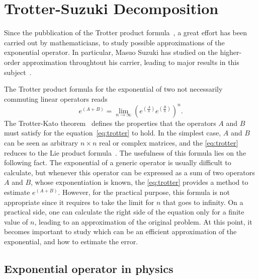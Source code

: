 \chapter{Trotter-Suzuki Decomposition}

Since the pubblication of the Trotter product formula~\cite{Trotter1959}, a great effort has been carried out by mathematicians, to study possible approximations of the exponential operator. In particular, Masuo Suzuki has studied on the higher-order approximation throughtout his carrier, leading to major results in this subject~\cite{Suzuki1985, Suzuki2000}.

The Trotter product formula for the exponential of two not necessarily commuting linear operators reads
\begin{equation} \label{eq:trotter}
e^{(A+B)} = \lim_{n\rightarrow\infty} (e^{(\frac{A}{n})} e^{(\frac{B}{n})})^n.
\end{equation}
The Trotter-Kato theorem~\cite{TrotterKatoTheorem} defines the properties that the operators $A$ and $B$ must satisfy for the equation~\eqref{eq:trotter} to hold. In the simplest case, $A$ and $B$ can be seen as arbitrary $n\times n$ real or complex matrices, and the \eqref{eq:trotter} reduces to the Lie product formula~\cite{LieSophus}. The usefulness of this formula lies on the following fact. The exponential of a generic operator is usually difficult to calculate, but whenever this operator can be expressed as a sum of two operators $A$ and $B$, whose exponentiation is known, the \eqref{eq:trotter} provides a method to estimate $e^{(A+B)}$. However, for the practical purpose, this formula is not appropriate since it requires to take the limit for $n$ that goes to infinity. On a practical side, one can calculate the right side of the equation only for a finite value of $n$, leading to an approximation of the original problem. At this point, it becomes important to study which can be an efficient approximation of the exponential, and how to estimate the error.

\section{Exponential operator in physics}

